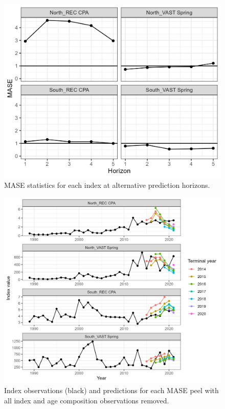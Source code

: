 \documentclass[
]{article}
\begin{document}
\begin{figure}

{\centering \includegraphics[width=1\linewidth]{../2023.RT.Runs/Run34/mase_WHAM for unnamed stock} 

}

\caption{MASE statistics for each index at alternative prediction horizons.}\label{fig:mase-by-index}
\end{figure}

\begin{figure}

{\centering \includegraphics[width=1\linewidth]{../2023.RT.Runs/Run34/predicted_vs_obs_WHAM for unnamed stock} 

}

\caption{Index observations (black) and predictions for each MASE peel with all index and age composition observations removed.}\label{fig:mase-obs-pred-by-index}
\end{figure}
\end{document}
